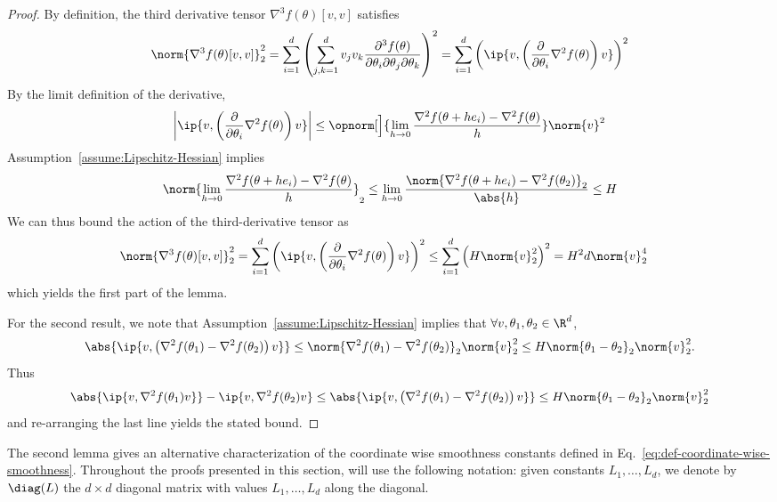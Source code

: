 \begin{proof}
    By definition, the third derivative tensor $\nabla^3 f(\theta)[v,v]$ satisfies
    \begin{align*}
        \norm{\nabla^3 f(\theta)[v,v]}^2_2 = \sum_{i=1}^d \left(\sum_{j,k=1}^d v_j v_k \frac{\partial^3 f(\theta)}{\partial \theta_i \partial \theta_j \partial \theta_k}\right)^2 = \sum_{i=1}^d \left(\ip{v, \left(\frac{\partial }{\partial \theta_i} \nabla^2 f(\theta)\right)v}\right)^2
    \end{align*}
    By the limit definition of the derivative,
    \[
        \left|\ip{v, \left(\frac{\partial }{\partial \theta_i} \nabla^2 f(\theta)\right)v}\right| \leq \opnorm[\Big]{\lim_{h\rightarrow 0} \frac{\nabla^2 f(\theta + he_i)- \nabla^2 f(\theta)}{h}} \norm{v}^2
    \]
    Assumption~\ref{assume:Lipschitz-Hessian} implies
    \[
        \norm{\lim_{h\rightarrow 0} \frac{\nabla^2 f(\theta + he_i)- \nabla^2 f(\theta)}{h}}_2 \leq  \lim_{h\rightarrow 0} \frac{\norm{\nabla^2 f(\theta + he_i)- \nabla^2 f(\theta_2)}_2}{\abs{h}} \leq H
    \]
    We can thus bound the action of the third-derivative tensor as
    \begin{align*}
        \norm{\nabla^3 f(\theta)[v,v]}^2_2 &= \sum_{i=1}^d \left(\ip{v, \left(\frac{\partial }{\partial \theta_i} \nabla^2 f(\theta)\right)v}\right)^2
        \leq \sum_{i=1}^d \left(H \norm{v}^2_2\right)^2 = H^2 d \norm{v}^4_2
    \end{align*}
    which yields the first part of the lemma.

    For the second result, we note that Assumption~\ref{assume:Lipschitz-Hessian} implies that $\forall v, \theta_1, \theta_2\in \R^d$, 
    \[
        \abs{\ip{v, \left(\nabla^2 f(\theta_1) - \nabla^2 f(\theta_2)\right) v}} \leq \norm{\nabla^2 f(\theta_1)-\nabla^2 f(\theta_2)}_2 \norm{v}^2_2 \leq H \norm{\theta_1 - \theta_2}_2 \norm{v}^2_2.
    \]
    Thus
    \[
        \abs{\ip{v, \nabla^2 f(\theta_1)v}} - \ip{v, \nabla^2 f(\theta_2)v} \leq \abs{\ip{v, \left(\nabla^2 f(\theta_1) - \nabla^2 f(\theta_2)\right) v}} \leq  H \norm{\theta_1 - \theta_2}_2 \norm{v}^2_2
    \]
    and re-arranging the last line yields the stated bound.
\end{proof}

The second lemma gives an alternative characterization of the coordinate wise smoothness constants defined in Eq.~\ref{eq:def-coordinate-wise-smoothness}. Throughout the proofs presented in this section, will use the following notation: given constants $L_1,\dots,L_d$, we denote by $\diag(L)$ the $d\times d$ diagonal matrix with values $L_1,\dots,L_d$ along the diagonal. 

